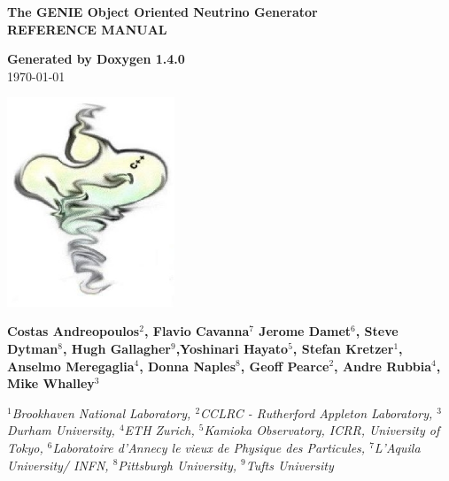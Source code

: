 \documentclass[a4paper]{book}
\begin{document}
\begin{titlepage}
\vspace*{3cm}
\begin{center}

{\Large \textbf{The GENIE Object Oriented Neutrino Generator}}\\
\vspace*{1cm}
{\Large \textbf{REFERENCE MANUAL}}\\
\vspace*{1cm}

{\large \textbf{Generated by Doxygen 1.4.0}}\\
\vspace*{0.5cm}
{\large \today}\\
\vspace*{1cm}

\includegraphics[width=5cm,keepaspectratio]{../../data/logo/genie_logo.eps}

\vspace*{0.6cm}

{\textbf{Costas Andreopoulos$^{2}$, Flavio Cavanna$^{7}$ Jerome Damet$^{6}$, Steve Dytman$^{8}$,
Hugh Gallagher$^{9}$,Yoshinari Hayato$^{5}$, Stefan Kretzer$^{1}$, Anselmo Meregaglia$^{4}$,
Donna Naples$^{8}$, Geoff Pearce$^{2}$, Andre Rubbia$^{4}$, Mike Whalley$^{3}$}}\\
\vspace*{0.5cm}

{\textit{$^{1}$Brookhaven National Laboratory, $^{2}$CCLRC - Rutherford Appleton Laboratory,
$^{3}$Durham University, $^{4}$ETH Zurich, $^{5}$Kamioka Observatory, ICRR, University of Tokyo, 
$^{6}$Laboratoire d'Annecy le vieux de Physique des Particules, $^{7}$L'Aquila University/ INFN, 
$^{8}$Pittsburgh University, $^{9}$Tufts University}}

\end{center}
\end{titlepage}
\clearemptydoublepage
{}
\tableofcontents
\clearemptydoublepage
{}
\end{document}
